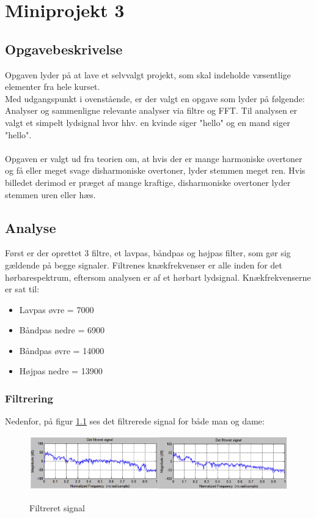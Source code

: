 \chapter{Miniprojekt 3}
\section{Opgavebeskrivelse}
Opgaven lyder på at lave et selvvalgt projekt, som skal indeholde væsentlige elementer fra hele kurset. \\
Med udgangspunkt i ovenstående, er der valgt en opgave som lyder på følgende: \\
Analyser og sammenligne relevante analyser via filtre og FFT.
Til analysen er valgt et simpelt lydsignal hvor hhv. en kvinde siger "hello" og en mand siger "hello".\\ \\
Opgaven er valgt ud fra teorien om, at hvis der er mange harmoniske overtoner og få eller meget svage disharmoniske overtoner, lyder stemmen meget ren. Hvis billedet derimod er præget af mange kraftige, disharmoniske overtoner lyder stemmen uren eller hæs.
\section{Analyse}
Først er der oprettet 3 filtre, et lavpas, båndpas og højpas filter, som gør sig gældende på begge signaler. Filtrenes knækfrekvenser er alle inden for det hørbarespektrum, eftersom analysen er af et hørbart lydsignal. Knækfrekvenserne er sat til:
\begin{itemize}
	\item Lavpas øvre = 7000
	\item Båndpas nedre = 6900
	\item Båndpas øvre = 14000
	\item Højpas nedre = 13900
\end{itemize}
\subsection{Filtrering}
Nedenfor, på figur \ref{Filtreret signal} ses det filtrerede signal for både man og dame:

\begin{figure}[H]
	\centering
	\includegraphics[width=1\textwidth]{Figurer/1}
	\label{Filtreret signal}
	\caption{Filtreret signal}
\end{figure}

